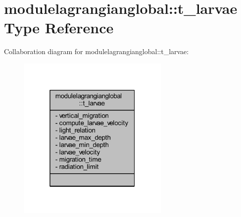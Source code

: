 \hypertarget{structmodulelagrangianglobal_1_1t__larvae}{}\section{modulelagrangianglobal\+:\+:t\+\_\+larvae Type Reference}
\label{structmodulelagrangianglobal_1_1t__larvae}


Collaboration diagram for modulelagrangianglobal\+:\+:t\+\_\+larvae\+:\nopagebreak
\begin{figure}[H]
\begin{center}
\leavevmode
\includegraphics[width=208pt]{structmodulelagrangianglobal_1_1t__larvae__coll__graph}
\end{center}
\end{figure}
